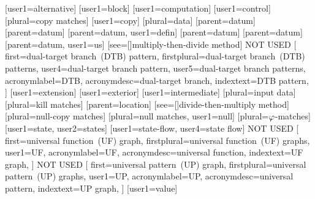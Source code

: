 [user1={alternative}]
[user1={block}]
[user1={computation}]
[user1={control}]
[plural={copy matches}]
[user1={copy}]
[plural={data}]
[parent={datum}]
[parent={datum}]
[parent={datum}, user1={defin}]
[parent={datum}]
[parent={datum}]
[parent={datum}, user1={us}]
%
        [see=[\seename]{multiply-then-divide method}]
%
           {NOT USED}%
           [%
             first={dual-target branch~(DTB) pattern},
             firstplural={dual-target branch~(DTB) patterns},
             user4={dual-target branch pattern},
             user5={dual-target branch patterns},
             acronymlabel={DTB},
             acronymdesc={dual-target branch},
             indextext={DTB pattern},
           ]
[user1={extension}]
[user1={exterior}]
[user1={intermediate}]
[plural={input data}]
[plural={kill matches}]
[parent={location}]
%
        [see=[\seename]{divide-then-multiply method}]
[plural={null-copy matches}]
[plural={null matches}, user1={null}]
[plural={{}$\varphi$-matches}]
[user1={state}, user2={states}]
[user1={state-flow}, user4={state flow}]
%
           {NOT USED}%
           [%
             first={universal function~(UF) graph},
             firstplural={universal function~(UF) graphs},
             user1={UF},
             acronymlabel={UF},
             acronymdesc={universal function},
             indextext={UF graph},
           ]
%
           {NOT USED}%
           [%
             first={universal pattern~(UP) graph},
             firstplural={universal pattern~(UP) graphs},
             user1={UP},
             acronymlabel={UP},
             acronymdesc={universal pattern},
             indextext={UP graph},
           ]
[user1={value}]


